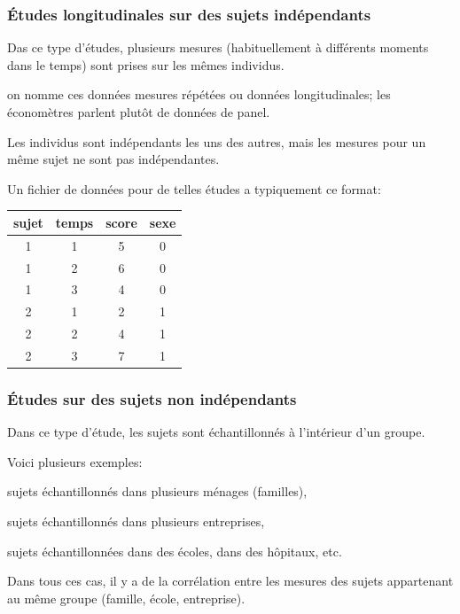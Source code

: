 \documentclass{beamer}
\begin{document}
\begin{frame}[fragile]
\frametitle{Études longitudinales sur des sujets indépendants}
\bi
\item Das ce type d'études, plusieurs mesures (habituellement à différents moments dans le temps) sont prises sur les mêmes individus. 
\bi

\item on nomme ces données \alert{mesures répétées} ou \alert{données longitudinales}; les économètres parlent plutôt de \alert{données de panel}.
\ei
\item Les individus sont \alert{indépendants} les uns des autres, mais les mesures pour un même sujet ne sont pas indépendantes.
\item Un fichier de données pour de telles études a typiquement ce format:
\ei
{\footnotesize 
\begin{table}
\centering

\begin{tabular}{cccc}
 \toprule 
 \textbf{sujet} & \textbf{temps} & \textbf{score} & \textbf{sexe}\\
 \midrule 
 1 & 1 & 5 & 0 \\
 1 & 2 & 6 & 0 \\
 1 & 3 & 4 & 0 \\
 2 & 1 & 2 & 1 \\
 2 & 2 & 4 & 1 \\
 2 & 3 & 7 & 1 \\
 \bottomrule
\end{tabular}
\end{table}
}

\end{frame}

\begin{frame}
\frametitle{Études sur des sujets non indépendants}
\bi
\item Dans ce type d'étude, les sujets sont échantillonnés à l'intérieur d'un \alert{groupe}.
\item Voici plusieurs exemples:
\bi

\item sujets échantillonnés dans plusieurs ménages (familles), 
\item sujets échantillonnés dans plusieurs entreprises, 
\item sujets échantillonnées dans des écoles, dans des hôpitaux, etc.
\ei
\item Dans tous ces cas, il y a de la corrélation entre les mesures des sujets appartenant au même groupe (famille, école, entreprise).
\ei
\end{frame}
\end{document}
